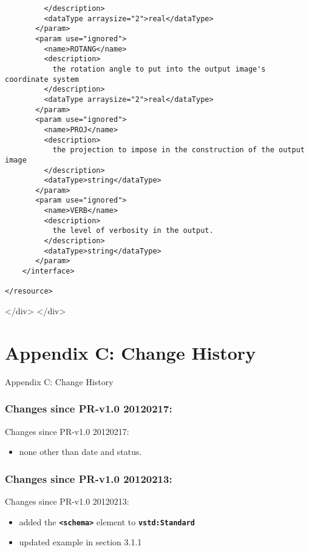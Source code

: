 \documentclass[11pt,a4paper]{ivoa}
\begin{document}
{{\begin{verbatim}
         </description>
         <dataType arraysize="2">real</dataType>
       </param>
       <param use="ignored">
         <name>ROTANG</name>
         <description>
           the rotation angle to put into the output image's coordinate system
         </description>
         <dataType arraysize="2">real</dataType>
       </param>
       <param use="ignored">
         <name>PROJ</name>
         <description>
           the projection to impose in the construction of the output image
         </description>
         <dataType>string</dataType>
       </param>
       <param use="ignored">
         <name>VERB</name>
         <description>
           the level of verbosity in the output.
         </description>
         <dataType>string</dataType>
       </param>
    </interface>
   
</resource>
\end{verbatim}

</div>
</div>

\section{Appendix C: Change History}

\label{}

Appendix C: Change History
\subsubsection{Changes since PR-v1.0 20120217:}
Changes since PR-v1.0 20120217:
\begin{itemize}

\item  none other than date and status.{}

\end{itemize}

\subsubsection{Changes since PR-v1.0 20120213:}
Changes since PR-v1.0 20120213:
\begin{itemize}

\item  added the \textbf{\texttt{<schema>}} element to
       \textbf{\texttt{vstd:Standard}}{}

\item  updated example in section 3.1.1 {}

\end{itemize}

}}
\end{document}
